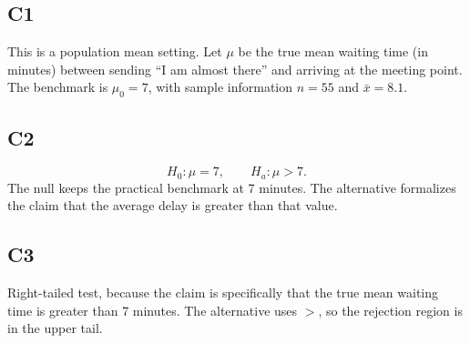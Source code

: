 	\subsection*{C1}
	This is a population mean setting. Let \(\mu\) be the true mean waiting time (in minutes) between sending ``I am almost there'' and arriving at the meeting point. The benchmark is \(\mu_0=7\), with sample information \(n=55\) and \(\bar{x}=8.1\).
	
	\subsection*{C2}
	\[
	H_0\colon \mu=7, \qquad H_a\colon \mu>7.
	\]
	The null keeps the practical benchmark at 7 minutes. The alternative formalizes the claim that the average delay is greater than that value.
	
	\subsection*{C3}
	Right-tailed test, because the claim is specifically that the true mean waiting time is greater than 7 minutes. The alternative uses \(>\), so the rejection region is in the upper tail.


